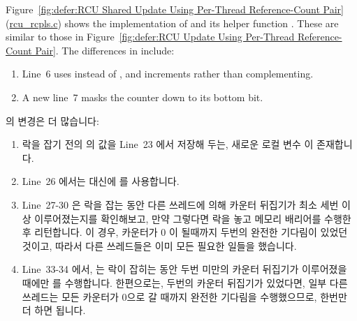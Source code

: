 Figure~\ref{fig:defer:RCU Shared Update Using Per-Thread Reference-Count Pair}
(\url{rcu_rcpls.c})
shows the implementation of  and its helper
function .
These are similar to those in
Figure~\ref{fig:defer:RCU Update Using Per-Thread Reference-Count Pair}.
The differences in  include:
\begin{enumerate}
\item	Line~6 uses  instead of ,
	and increments rather than complementing.
\item	A new line~7 masks the counter down to its bottom bit.
\end{enumerate}
\fi

 의 변경은 더 많습니다:
\begin{enumerate}
\item	락을 잡기 전의  의 값을 Line~23 에서 저장해 두는, 새로운
	로컬 변수  이 존재합니다.
\item	Line~26 에서는  대신에  를
	사용합니다.
\item	Line~27-30 은 락을 잡는 동안 다른 쓰레드에 의해 카운터 뒤집기가 최소
	세번 이상 이루어졌는지를 확인해보고, 만약 그렇다면 락을 놓고 메모리
	배리어를 수행한 후 리턴합니다.
	이 경우, 카운터가 0 이 될때까지 두번의 완전한 기다림이 있었던 것이고,
	따라서 다른 쓰레드들은 이미 모든 필요한 일들을 했습니다.
\item	Line~33-34 에서,  는 락이 잡히는 동안 두번
	미만의 카운터 뒤집기가 이루어졌을 때에만 
	를 수행합니다.
	한편으로는, 두번의 카운터 뒤집기가 있었다면, 일부 다른 쓰레드는 모든
	카운터가 0으로 갈 때까지 완전한 기다림을 수행했으므로, 한번만 더 하면
	됩니다.
\end{enumerate}
\iffalse

The changes to \co{synchronize_rcu()} are more pervasive:
\begin{enumerate}
\item	There is a new \co{oldctr} local variable that captures
	the pre-lock-acquisition value of \co{rcu_idx} on
	line~23.
\item	Line~26 uses \co{ACCESS_ONCE()} instead of \co{atomic_read()}.
\item	Lines~27-30 check to see if at least three counter flips were
	performed by other threads while the lock was being acquired,
	and, if so, releases the lock, does a memory barrier, and returns.
	In this case, there were two full waits for the counters to
	go to zero, so those other threads already did all the required work.
\item	At lines~33-34, \co{flip_counter_and_wait()} is only
	invoked a second time if there were fewer than two counter flips
	while the lock was being acquired.
	On the other hand, if there were two counter flips, some other
	thread did one full wait for all the counters to go to zero,
	so only one more is required.
\end{enumerate}
\fi

